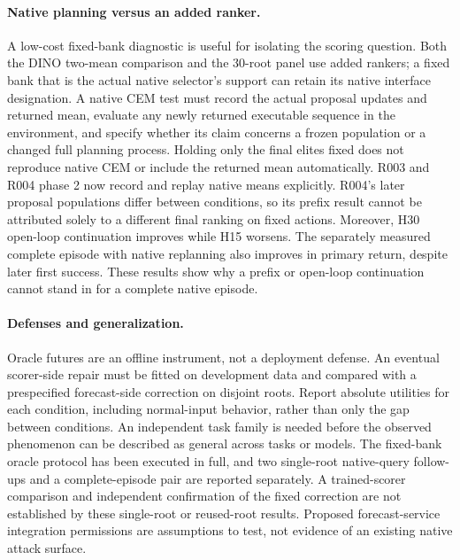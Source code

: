 \documentclass[11pt]{article}
\begin{document}
\paragraph{Native planning versus an added ranker.}
A low-cost fixed-bank diagnostic is useful for isolating the scoring question.
Both the DINO two-mean comparison and the 30-root panel use added rankers;
a fixed bank that is the actual native selector's support can retain its native
interface designation. A native CEM test must record the actual
proposal updates and returned mean, evaluate any newly returned executable
sequence in the environment, and specify whether its claim concerns a frozen
population or a changed full planning process. Holding only the final elites
fixed does not reproduce native CEM or include the returned mean automatically.
R003 and R004 phase 2 now record and replay native means explicitly. R004's
later proposal populations differ between conditions, so its prefix result
cannot be attributed solely to a different final ranking on fixed actions.
Moreover, H30 open-loop continuation improves while H15 worsens. The separately
measured complete episode with native replanning also improves in primary
return, despite later first success. These results show why a prefix or
open-loop continuation cannot stand in for a complete native episode.

\paragraph{Defenses and generalization.}
Oracle futures are an offline instrument, not a deployment defense. An eventual
scorer-side repair must be fitted on development data and compared with a
prespecified forecast-side correction on disjoint roots. Report absolute
utilities for each condition, including normal-input behavior, rather than
only the gap between conditions. An independent task family is needed before
the observed phenomenon can be described as general across tasks or models.
The fixed-bank oracle protocol has been executed in full, and two single-root
native-query follow-ups and a complete-episode pair are reported separately.
A trained-scorer comparison and independent confirmation of the fixed correction
are not established by these single-root or reused-root results. Proposed
forecast-service integration permissions are assumptions to test, not evidence
of an existing native attack surface.
\end{document}
